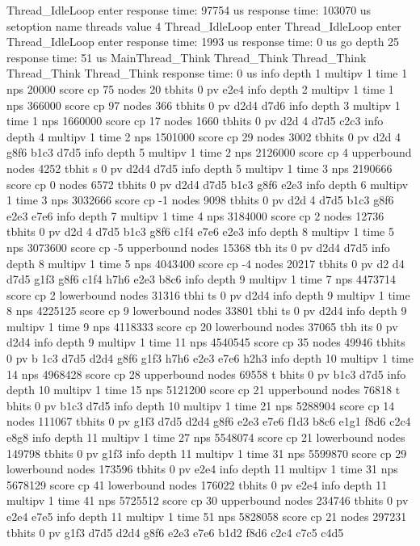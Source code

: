 Thread_IdleLoop enter
response time:  97754 us
response time:  103070 us
setoption name threads value 4
Thread_IdleLoop enter
Thread_IdleLoop enter
Thread_IdleLoop enter
response time:  1993 us
response time:  0 us
go depth 25
response time:  51 us
MainThread_Think
Thread_Think
Thread_Think
Thread_Think
Thread_Think
response time:  0 us
info depth 1 multipv 1 time 1 nps 20000 score cp 75 nodes 20 tbhits 0 pv e2e4
info depth 2 multipv 1 time 1 nps 366000 score cp 97 nodes 366 tbhits 0 pv d2d4
d7d6
info depth 3 multipv 1 time 1 nps 1660000 score cp 17 nodes 1660 tbhits 0 pv d2d
4 d7d5 c2c3
info depth 4 multipv 1 time 2 nps 1501000 score cp 29 nodes 3002 tbhits 0 pv d2d
4 g8f6 b1c3 d7d5
info depth 5 multipv 1 time 2 nps 2126000 score cp 4 upperbound nodes 4252 tbhit
s 0 pv d2d4 d7d5
info depth 5 multipv 1 time 3 nps 2190666 score cp 0 nodes 6572 tbhits 0 pv d2d4
 d7d5 b1c3 g8f6 e2e3
info depth 6 multipv 1 time 3 nps 3032666 score cp -1 nodes 9098 tbhits 0 pv d2d
4 d7d5 b1c3 g8f6 e2e3 e7e6
info depth 7 multipv 1 time 4 nps 3184000 score cp 2 nodes 12736 tbhits 0 pv d2d
4 d7d5 b1c3 g8f6 c1f4 e7e6 e2e3
info depth 8 multipv 1 time 5 nps 3073600 score cp -5 upperbound nodes 15368 tbh
its 0 pv d2d4 d7d5
info depth 8 multipv 1 time 5 nps 4043400 score cp -4 nodes 20217 tbhits 0 pv d2
d4 d7d5 g1f3 g8f6 c1f4 h7h6 e2e3 b8c6
info depth 9 multipv 1 time 7 nps 4473714 score cp 2 lowerbound nodes 31316 tbhi
ts 0 pv d2d4
info depth 9 multipv 1 time 8 nps 4225125 score cp 9 lowerbound nodes 33801 tbhi
ts 0 pv d2d4
info depth 9 multipv 1 time 9 nps 4118333 score cp 20 lowerbound nodes 37065 tbh
its 0 pv d2d4
info depth 9 multipv 1 time 11 nps 4540545 score cp 35 nodes 49946 tbhits 0 pv b
1c3 d7d5 d2d4 g8f6 g1f3 h7h6 e2e3 e7e6 h2h3
info depth 10 multipv 1 time 14 nps 4968428 score cp 28 upperbound nodes 69558 t
bhits 0 pv b1c3 d7d5
info depth 10 multipv 1 time 15 nps 5121200 score cp 21 upperbound nodes 76818 t
bhits 0 pv b1c3 d7d5
info depth 10 multipv 1 time 21 nps 5288904 score cp 14 nodes 111067 tbhits 0 pv
 g1f3 d7d5 d2d4 g8f6 e2e3 e7e6 f1d3 b8c6 e1g1 f8d6 c2c4 e8g8
info depth 11 multipv 1 time 27 nps 5548074 score cp 21 lowerbound nodes 149798
tbhits 0 pv g1f3
info depth 11 multipv 1 time 31 nps 5599870 score cp 29 lowerbound nodes 173596
tbhits 0 pv e2e4
info depth 11 multipv 1 time 31 nps 5678129 score cp 41 lowerbound nodes 176022
tbhits 0 pv e2e4
info depth 11 multipv 1 time 41 nps 5725512 score cp 30 upperbound nodes 234746
tbhits 0 pv e2e4 e7e5
info depth 11 multipv 1 time 51 nps 5828058 score cp 21 nodes 297231 tbhits 0 pv
 g1f3 d7d5 d2d4 g8f6 e2e3 e7e6 b1d2 f8d6 c2c4 c7c5 c4d5

